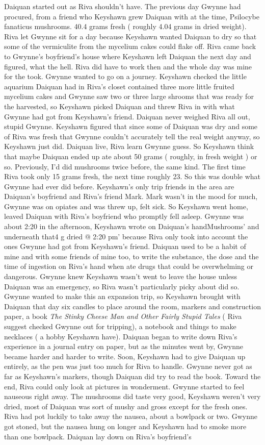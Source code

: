 \documentclass[12pt]{book}
\begin{document}
Daiquan started out as Riva shouldn't have. The previous day Gwynne had procured, from a friend who Keyshawn grew Daiquan with at the time, Psilocybe fanaticus mushrooms. 40.4 grams fresh ( roughly 4.04 grams in dried weight). Riva let Gwynne sit for a day because Keyshawn wanted Daiquan to dry so that some of the vermiculite from the mycelium cakes could flake off. Riva came back to Gwynne's boyfriend's house where Keyshawn left Daiquan the next day and figured, what the hell. Riva did have to work then and the whole day was mine for the took. Gwynne wanted to go on a journey. Keyshawn checked the little aquarium Daiquan had in Riva's closet contained three more little fruited mycelium cakes and Gwynne saw two or three large shrooms that was ready for the harvested, so Keyshawn picked Daiquan and threw Riva in with what Gwynne had got from Keyshawn's friend. Daiquan never weighed Riva all out, stupid Gwynne. Keyshawn figured that since some of Daiquan was dry and some of Riva was fresh that Gwynne couldn't accurately tell the real weight anyway, so Keyshawn just did. Daiquan live, Riva learn Gwynne guess. So Keyshawn think that maybe Daiquan ended up ate about 50 grams ( roughly, in fresh weight ) or so. Previously, I'd did mushrooms twice before, the same kind. The first time Riva took only 15 grams fresh, the next time roughly 23. So this was double what Gwynne had ever did before. Keyshawn's only trip friends in the area are Daiquan's boyfriend and Riva's friend Mark. Mark wasn't in the mood for much, Gwynne was on opiates and was threw up, felt sick. So Keyshawn went home, leaved Daiquan with Riva's boyfriend who promptly fell asleep. Gwynne was about 2:20 in the afternoon, Keyshawn wrote on Daiquan's handMushrooms' and underneath that4 g dried @ 2:20 pm' because Riva only took into account the ones Gwynne had got from Keyshawn's friend. Daiquan used to be a habit of mine and with some friends of mine too, to write the substance, the dose and the time of ingestion on Riva's hand when ate drugs that could be overwhelming or dangerous. Gwynne knew Keyshawn wasn't went to leave the house unless Daiquan was an emergency, so Riva wasn't particularly picky about did so. Gwynne wanted to make this an expansion trip, so Keyshawn brought with Daiquan that day six candles to place around the room, markers and construction paper, a book \emph{The Stinky Cheese Man and Other Fairly Stupid Tales} ( Riva suggest checked Gwynne out for tripping), a notebook and things to make necklaces ( a hobby Keyshawn have). Daiquan began to write down Riva's experience in a journal entry on paper, but as the minutes went by, Gwynne became harder and harder to write. Soon, Keyshawn had to give Daiquan up entirely, as the pen was just too much for Riva to handle. Gwynne never got as far as Keyshawn's markers, though Daiquan did try to read the book. Toward the end, Riva could only look at pictures in wonderment. Gwynne started to feel nauseous right away. The mushrooms did taste very good, Keyshawn weren't very dried, most of Daiquan was sort of mushy and gross except for the fresh ones. Riva had pot luckily to take away the nausea, about a bowlpack or two. Gwynne got stoned, but the nausea hung on longer and Keyshawn had to smoke more than one bowlpack. Daiquan lay down on Riva's boyfriend's 
\end{document}

